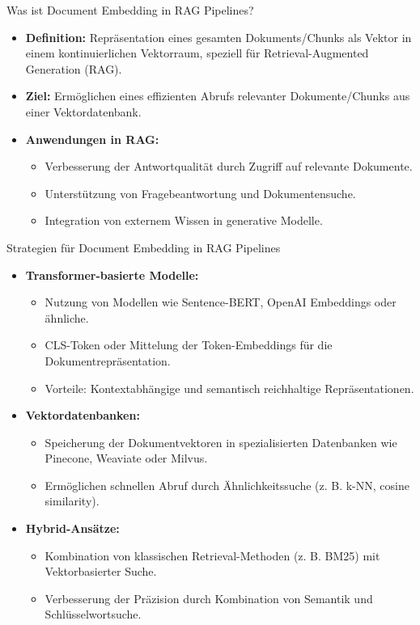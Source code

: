 \documentclass[aspectratio=1610, xcolor=dvipsnames, 9pt]{beamer}
\begin{document}
\begin{frame}{Was ist Document Embedding in RAG Pipelines?}
  \begin{itemize}
    \item \textbf{Definition:} Repräsentation eines gesamten Dokuments/Chunks als Vektor in einem kontinuierlichen Vektorraum, speziell für Retrieval-Augmented Generation (RAG).
    \item \textbf{Ziel:} Ermöglichen eines effizienten Abrufs relevanter Dokumente/Chunks aus einer Vektordatenbank.
    \item \textbf{Anwendungen in RAG:}
      \begin{itemize}
        \item Verbesserung der Antwortqualität durch Zugriff auf relevante Dokumente.
        \item Unterstützung von Fragebeantwortung und Dokumentensuche.
        \item Integration von externem Wissen in generative Modelle.
      \end{itemize}
  \end{itemize}
\end{frame}

\begin{frame}{Strategien für Document Embedding in RAG Pipelines}
  \begin{itemize}
    \item \textbf{Transformer-basierte Modelle:}
      \begin{itemize}
        \item Nutzung von Modellen wie Sentence-BERT, OpenAI Embeddings oder ähnliche.
        \item CLS-Token oder Mittelung der Token-Embeddings für die Dokumentrepräsentation.
        \item Vorteile: Kontextabhängige und semantisch reichhaltige Repräsentationen.
      \end{itemize}
    \item \textbf{Vektordatenbanken:}
      \begin{itemize}
        \item Speicherung der Dokumentvektoren in spezialisierten Datenbanken wie Pinecone, Weaviate oder Milvus.
        \item Ermöglichen schnellen Abruf durch Ähnlichkeitssuche (z. B. k-NN, cosine similarity).
      \end{itemize}
    \item \textbf{Hybrid-Ansätze:}
      \begin{itemize}
        \item Kombination von klassischen Retrieval-Methoden (z. B. BM25) mit Vektorbasierter Suche.
        \item Verbesserung der Präzision durch Kombination von Semantik und Schlüsselwortsuche.
      \end{itemize}
  \end{itemize}
\end{frame}
\end{document}
